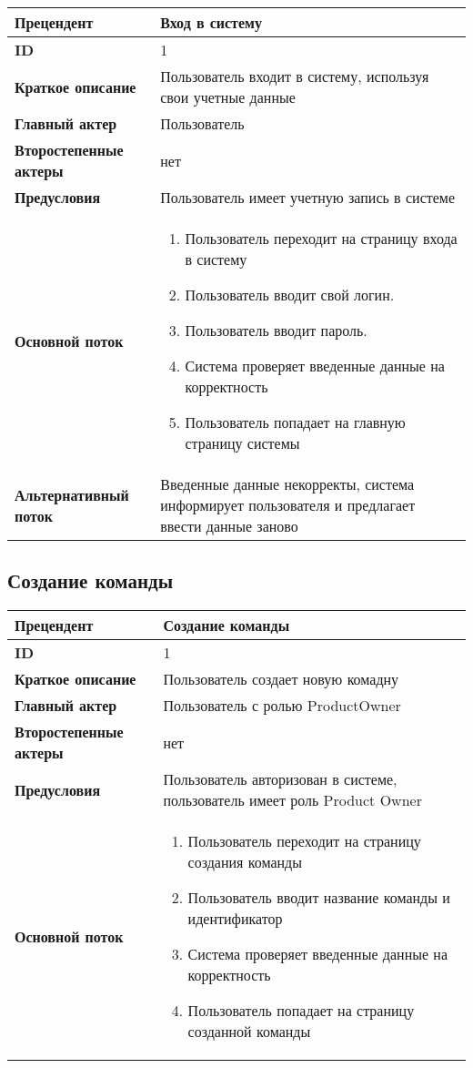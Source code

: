 \documentclass{article}
\begin{document}
\begin{tabular}{|l|p{9cm}|}
  \hline
  \textbf{Прецендент} & Вход в систему \\
  \hline
  \textbf{ID} & 1 \\
  \hline
  \textbf{Краткое описание} & Пользователь входит в систему, используя свои учетные данные \\
  \hline
  \textbf{Главный актер} & Пользователь\\
  \hline
  \textbf{Второстепенные актеры} & нет \\
  \hline
  \textbf{Предусловия} &  Пользователь имеет учетную запись в системе\\
  \hline
  \textbf{Основной поток} & \begin{enumerate}
    \item Пользователь переходит на страницу входа в систему
    \item Пользователь вводит свой логин.
    \item Пользователь вводит пароль.
    \item Система проверяет введенные данные на корректность
    \item Пользователь попадает на главную страницу системы
  \end{enumerate} \\
  \hline
  \textbf{Альтернативный поток} & Введенные данные некорректы, система информирует пользователя и предлагает ввести данные заново\\
  \hline
\end{tabular}

\subsection{Создание команды}

\begin{tabular}{|l|p{9cm}|}
  \hline
  \textbf{Прецендент} & Создание команды  \\
  \hline
  \textbf{ID} & 1 \\
  \hline
  \textbf{Краткое описание} & Пользователь создает новую комадну\\
  \hline
  \textbf{Главный актер} & Пользователь с ролью ProductOwner \\
  \hline
  \textbf{Второстепенные актеры} & нет \\
  \hline
  \textbf{Предусловия} &  Пользователь авторизован в системе, пользователь имеет роль Product Owner \\
  \hline
  \textbf{Основной поток} & \begin{enumerate}
    \item Пользователь переходит на страницу создания команды
    \item Пользователь вводит название команды и идентификатор
    \item Система проверяет введенные данные на корректность
    \item Пользователь попадает на страницу созданной команды
  \end{enumerate} \\
  \hline
\end{tabular}
\end{document}
